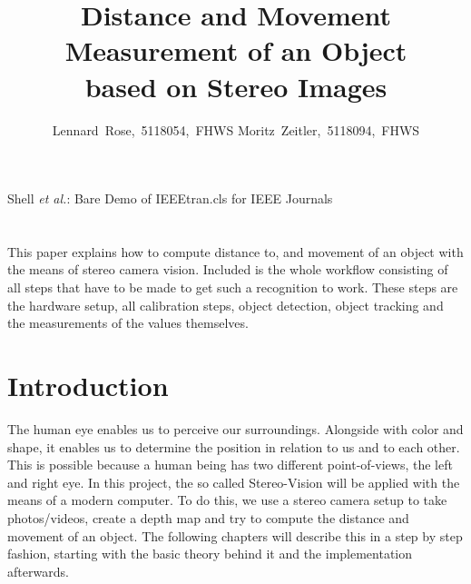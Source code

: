 \documentclass[journal,onecolumn]{IEEEtran}
\makeatletter
\renewenvironment{abstract}{%
    \if@twocolumn
      \section*{\abstractname}%
    \else %
      \begin{center}%
        {\bfseries \Large\abstractname\vspace{\z@}}%
      \end{center}%
      \quotation
    \fi}
    {\if@twocolumn\else\endquotation\fi}
\makeatother
\begin{document}
	\title{Distance and Movement Measurement of an Object\\ based on Stereo Images}

	\author{Lennard~Rose,~5118054,~FHWS
		Moritz~Zeitler,~5118094,~FHWS%
	}
	{Shell \MakeLowercase{\textit{et al.}}: Bare Demo of IEEEtran.cls for IEEE Journals}

	\maketitle

	\begin{abstract}
   		\normalsize
		\noindent
		This paper explains how to compute distance to, and movement of an object with the means of stereo camera vision.
		Included is the whole workflow consisting of all steps that have to be made to get such a recognition to work. These steps are the hardware setup, all calibration steps, object detection, object tracking and the measurements of the values themselves.
	\end{abstract}


	\IEEEpeerreviewmaketitle

	\section{Introduction}
\label{sec:einfuehrung}
\noindent
The human eye enables us to perceive our surroundings. Alongside with color and shape, it enables us to determine the position in relation to us and to each other. This is possible because a human being has two different point-of-views, the left and right eye. In this project, the so called Stereo-Vision will be applied with the means of a modern computer. To do this, we use a stereo camera setup to take photos/videos, create a depth map and try to compute the distance and movement of an object. The following chapters will describe this in a step by step fashion, starting with the basic theory behind it and the implementation afterwards.
\end{document}

